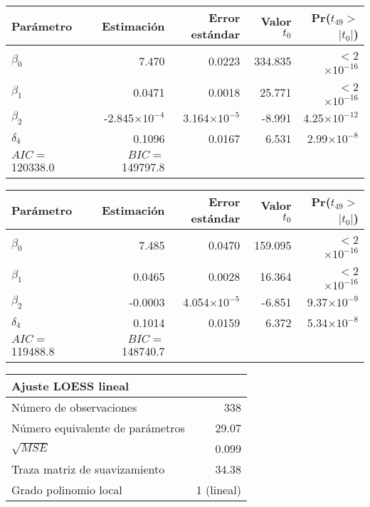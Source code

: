 \documentclass[11pt]{article}
\begin{document}
\begin{table}[ht]
\centering
\begin{tabular}{lrrrr}
\hline
 Parámetro & Estimación & Error estándar & Valor $t_0$ & Pr($t_{49}>$$|t_0|$) \\ 
  \hline
$\beta_0$ & 7.470 & 0.0223 & 334.835 & $<$2$\times10^{-16}$ \\ 
  $\beta_1$ & 0.0471 & 0.0018 & 25.771 & $<$2$\times10^{-16}$ \\ 
  $\beta_2$ & -2.845$\times10^{-4}$ & 3.164$\times10^{-5}$ & -8.991 & 4.25$\times10^{-12}$ \\ 
  $\delta_4$ & 0.1096 & 0.0167 & 6.531 & 2.99$\times10^{-8}$ \\ 
   \hline
	$AIC=$ 120338.0 & $BIC=$ 149797.8 & & & \\
	\hline
\end{tabular}
\end{table}

\begin{table}[ht]
\centering
\begin{tabular}{lrrrr}
\hline
 Parámetro& Estimación & Error estándar & Valor $t_0$ & Pr($t_{49}>$$|t_0|$) \\ 
  \hline
$\beta_0$ & 7.485 & 0.0470 & 159.095 & $<$2$\times10^{-16}$ \\ 
  $\beta_1$ & 0.0465 & 0.0028 & 16.364 & $<$2$\times10^{-16}$ \\ 
  $\beta_2$ & -0.0003 & 4.054$\times10^{-5}$ & -6.851 & 9.37$\times10^{-9}$ \\ 
  $\delta_4$ & 0.1014 & 0.0159 & 6.372 & 5.34$\times10^{-8}$ \\ 
   \hline
	$AIC=$ 119488.8 & $BIC=$ 148740.7 & & & \\
	\hline
\end{tabular}
\end{table}

\begin{table}[ht]
\centering
\begin{tabular}{lr}
 Ajuste LOESS lineal & \\ 
 \hline
 Número de observaciones & 338 \\
 Número equivalente de parámetros & 29.07 \\
 $\sqrt{MSE}$ & 0.099 \\
 Traza matriz de suavizamiento & 34.38\\
Grado polinomio local & 1 (lineal)\\
   \hline
\end{tabular}
\end{table}
\end{document}
